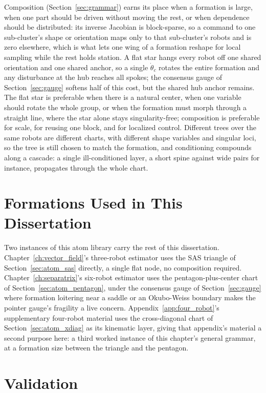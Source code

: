 \documentclass[12pt, letterpaper, oneside]{report}
\begin{document}
Composition (Section~\ref{sec:grammar}) earns its place when a formation is
large, when one part should be driven without moving the rest, or when
dependence should be distributed: its inverse Jacobian is block-sparse, so
a command to one sub-cluster's shape or orientation maps only to that
sub-cluster's robots and is zero elsewhere, which is what lets one wing of
a formation reshape for local sampling while the rest holds station. A flat
star hangs every robot off one shared orientation and one shared anchor, so
a single $\dot\theta_c$ rotates the entire formation and any disturbance at
the hub reaches all spokes; the consensus gauge of
Section~\ref{sec:gauge} softens half of this cost, but the shared hub anchor
remains. The flat star is preferable when there is a natural center, when
one variable should rotate the whole group, or when the formation must
morph through a straight line, where the star alone stays
singularity-free; composition is preferable for scale, for reusing one
block, and for localized control. Different trees over the same robots are
different charts, with different shape variables and singular loci, so the
tree is still chosen to match the formation, and conditioning compounds
along a cascade: a single ill-conditioned layer, a short spine against wide
pairs for instance, propagates through the whole chart.

\section{Formations Used in This Dissertation}
\label{sec:formations_used}

Two instances of this atom library carry the rest of this dissertation.
Chapter~\ref{ch:vector_field}'s three-robot estimator uses the SAS triangle
of Section~\ref{sec:atom_sas} directly, a single flat node, no composition
required. Chapter~\ref{ch:separatrix}'s six-robot estimator uses the
pentagon-plus-center chart of Section~\ref{sec:atom_pentagon}, under the
consensus gauge of Section~\ref{sec:gauge} where formation loitering near a
saddle or an Okubo-Weiss boundary makes the pointer gauge's fragility a live
concern. Appendix~\ref{app:four_robot}'s supplementary four-robot material
uses the cross-diagonal chart of Section~\ref{sec:atom_xdiag} as its
kinematic layer, giving that appendix's material a second purpose here: a
third worked instance of this chapter's general grammar, at a formation
size between the triangle and the pentagon.

\section{Validation}
\label{sec:cb_validation}
\end{document}
